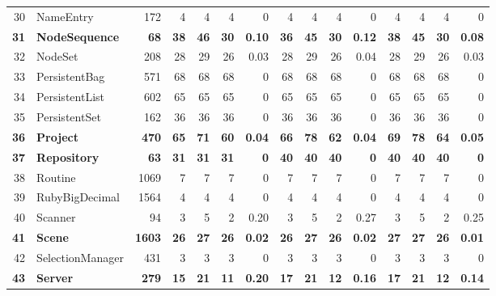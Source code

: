 \documentclass[conference]{IEEEtran}
\begin{document}
\begin{table} [htp!]
{\begin{tabularx}{1 \textwidth}{r l r r r r r r r r r r r r r}
30						& NameEntry				&172		& 4		&	4	&	4	& 	0					& 4		& 4 		& 4		& 		0			& 4			& 4			& 4			&	0	\\  
\textbf{31}						& \textbf{NodeSequence}			&\textbf{68}			& \textbf{38}		&	\textbf{46}	&	\textbf{30}	& 	\textbf{0.10}					& \textbf{36}		& \textbf{45} 		& \textbf{30}		& 		\textbf{0.12}			& \textbf{38}			& \textbf{45}			& \textbf{30}			&	\textbf{0.08}	\\     
32						& NodeSet				&208		& 28		&	29	&	26	& 	0.03					& 28		& 29 		& 26		& 		0.04			& 28			& 29			& 26			&	0.03	\\  
33						& PersistentBag			&571		& 68		&	68	&	68	& 	0					& 68		&  68		& 68		& 		0			& 68			& 68			& 68			&	0	\\         
34						& PersistentList				&602		& 65		&	65	&	65	& 	0					& 65		&  65		& 65		& 		0			& 65			& 65			& 65			&	0	\\    
35						& PersistentSet				&162		& 36		&	36	&	36	& 	0					& 36		&  36		& 36		& 		0			& 36			& 36			& 36 			&	0	\\        
\textbf{36}						& \textbf{Project}					&\textbf{470}		& \textbf{65}		&	\textbf{71}	&	\textbf{60}	& 	\textbf{0.04}					& \textbf{66}		&  \textbf{78}		& \textbf{62}		& 		\textbf{0.04}			& \textbf{69}			& \textbf{78}			& \textbf{64}			&	\textbf{0.05}	\\        
\textbf{37}						& \textbf{Repository}				&\textbf{63}			& \textbf{31}		&	\textbf{31}	&	\textbf{31}	& 	\textbf{0}					& \textbf{40}		&  \textbf{40}		& \textbf{40}		& 		\textbf{0}			& \textbf{40}			& \textbf{40}			& \textbf{40}			&	\textbf{0}	\\         
38						& Routine					&1069		& 7		&	7	&	7	& 	0					& 7		&  7		& 7		& 		0			& 7			& 7			& 7			&	0	\\
39						& RubyBigDecimal			&1564		& 4 		&	4	&	4	& 	0					& 4		& 4 		& 4		& 		0			& 4			& 4			& 4			&	0\\      
40						& Scanner				&94			& 3		&	5	&	2	& 	0.20					& 3		& 5 		& 2		& 		0.27			& 3			& 5			& 2			&	0.25\\      
\textbf{41}						& \textbf{Scene}					&\textbf{1603}		& \textbf{26}		&	\textbf{27}	&	\textbf{26}	& 	\textbf{0.02}					& \textbf{26}		& \textbf{27} 		& \textbf{26}		& 		\textbf{0.02}			& \textbf{27}			& \textbf{27}			& \textbf{26}			&	\textbf{0.01}\\      
42						& SelectionManager			&431		& 3		&	3	&	3	& 	0					& 3		& 3 		& 3		& 		0			& 3			& 3			& 3			&	0\\      
\textbf{43}						& \textbf{Server}					&\textbf{279}		&\textbf{15}		&	\textbf{21}	&	\textbf{11}	& 	\textbf{0.20}					& \textbf{17}		& \textbf{21} 		& \textbf{12}		& 		\textbf{0.16}			& \textbf{17}			& \textbf{21}			& \textbf{12}			&	\textbf{0.14}\\      

\end{tabularx}}
\end{table}
\end{document}
